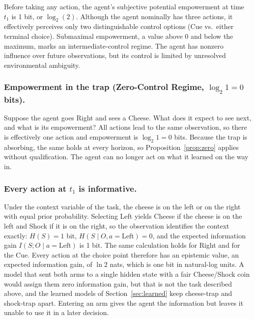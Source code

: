 \documentclass[letterpaper]{article} %
\theoremstyle{definition}
\begin{document}
Before taking any action, the agent's subjective potential empowerment at time $t_1$ is 1 bit, or $\log_2(2)$. Although the agent nominally has three actions, it effectively perceives only two distinguishable control options (Cue vs.\ either terminal choice). Submaximal empowerment, a value above 0 and below the maximum, marks an intermediate-control regime. The agent has nonzero influence over future observations, but its control is limited by unresolved environmental ambiguity.

\subsubsection{Empowerment in the trap (Zero-Control Regime, $\log_2 1 = 0$ bits).}
Suppose the agent goes Right and sees a Cheese. What does it expect to see next, and what is its empowerment? All actions lead to the same observation, so there is effectively one action and empowerment is $\log_2 1 = 0$ bits. Because the trap is absorbing, the same holds at every horizon, so Proposition~\ref{prop:zero} applies without qualification. The agent can no longer act on what it learned on the way in.

\subsubsection{Every action at $t_1$ is informative.}\label{sec:efe}
Under the context variable of the task, the cheese is on the left or on the right with equal prior probability. Selecting Left yields Cheese if the cheese is on the left and Shock if it is on the right, so the observation identifies the context exactly: $H(S) = 1$ bit, $H(S \mid O, a = \text{Left}) = 0$, and the expected information gain $I(S; O \mid a = \text{Left})$ is 1 bit. The same calculation holds for Right and for the Cue. Every action at the choice point therefore has an epistemic value, an expected information gain, of $\ln 2$ nats, which is one bit in natural-log units. A model that sent both arms to a single hidden state with a fair Cheese/Shock coin would assign them zero information gain, but that is not the task described above, and the learned models of Section~\ref{sec:learned} keep cheese-trap and shock-trap apart. Entering an arm gives the agent the information but leaves it unable to use it in a later decision.
\end{document}
